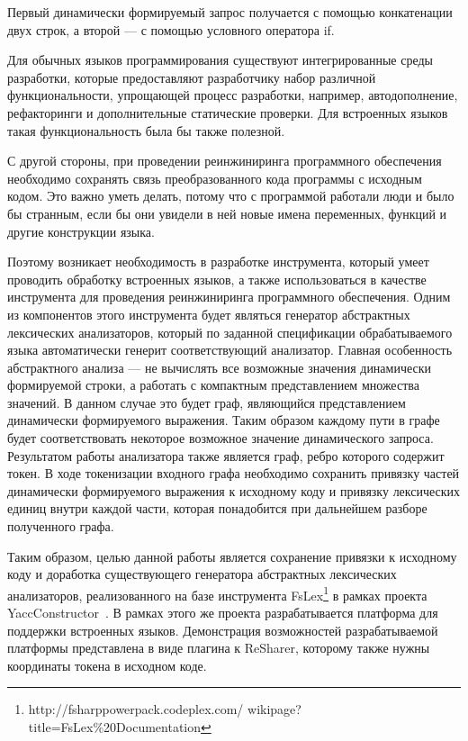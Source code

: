 Первый динамически формируемый запрос получается с помощью конкатенации двух строк, а второй --- с помощью условного оператора if.

Для обычных языков программирования существуют интегрированные среды разработки, которые предоставляют разработчику набор различной 
функциональности, упрощающей процесс разработки, например, автодополнение, рефакторинги и дополнительные статические проверки.
Для встроенных языков такая функциональность была бы также полезной.

С другой стороны, при проведении реинжиниринга программного обеспечения необходимо сохранять связь преобразованного кода программы
с исходным кодом.  Это важно уметь делать, потому что с  программой работали люди и было бы странным, если бы они увидели в ней новые 
имена переменных, функций и другие конструкции языка.  

Поэтому возникает необходимость в разработке инструмента, который умеет проводить обработку встроенных языков, а также использоваться
в качестве инструмента для проведения реинжиниринга программного обеспечения. Одним из компонентов этого инструмента будет 
являться генератор абстрактных лексических анализаторов, который по заданной спецификации обрабатываемого языка автоматически генерит 
соответствующий  анализатор. Главная особенность абстрактного анализа –-- не вычислять все возможные значения динамически формируемой 
строки, а работать с компактным представлением множества значений.   В данном случае это будет граф, являющийся представлением динамически 
формируемого выражения.  Таким образом каждому пути в графе будет соответствовать некоторое возможное значение динамического запроса.
Результатом работы анализатора также является граф, ребро которого содержит токен. В ходе токенизации входного графа необходимо сохранить 
привязку частей динамически формируемого выражения к исходному коду и привязку лексических единиц внутри каждой части, которая понадобится 
при дальнейшем разборе полученного графа. 

Таким образом, целью данной работы является сохранение привязки к исходному коду и доработка существующего генератора абстрактных лексических 
анализаторов, реализованного на базе инструмента FsLex\footnote{http://fsharppowerpack.codeplex.com/ wikipage?title=FsLex\%20Documentation} 
в рамках проекта YaccConstructor~\cite{YC_article}. В рамках этого же проекта разрабатывается платформа для поддержки встроенных языков. 
Демонстрация возможностей разрабатываемой платформы представлена в виде плагина к ReSharer, которому также нужны координаты токена в 
исходном коде. 

